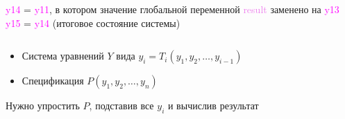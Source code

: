 \documentclass{beamer}
\begin{document}
\begin{frame}[containsverbatim]
{\begin{columns}
\begin{allintypewriter}
    \textcolor{magenta}{y14} = \textcolor{magenta}{y11}, в котором значение глобальной переменной \textcolor{violet}{result} заменено на \textcolor{magenta}{y13}\\
    \textcolor{magenta}{y15} = \textcolor{magenta}{y14} (итоговое состояние системы)
    \end{allintypewriter}
    \end{columns}
  }
  \bigskip
  \begin{itemize}
    \item Система уравнений $Y$ вида $y_i = T_i(y_1, y_2, \dots, y_{i - 1})$
    \item Спецификация $P(y_1, y_2, \dots, y_n)$
  \end{itemize}
  \bigskip
  Нужно упростить $P$, подставив все $y_i$ и вычислив результат
\end{frame}
\end{document}
